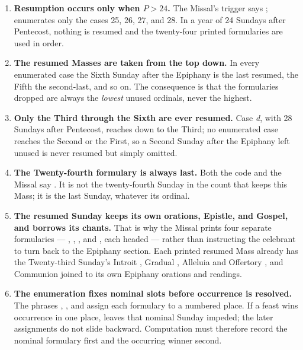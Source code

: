 \begin{enumerate}[leftmargin=1.6em, itemsep=0.35em]
\item \textbf{Resumption occurs only when $P > 24$.} The Missal's trigger says ;  enumerates only the cases 25, 26, 27, and 28. In a year of 24 Sundays after
Pentecost, nothing is resumed and the twenty-four printed formularies are used in order.
\item \textbf{The resumed Masses are taken from the top down.} In every enumerated case the
Sixth Sunday after the Epiphany is the last resumed, the Fifth the second-last, and so on. The
consequence is that the formularies dropped are always the \emph{lowest} unused ordinals, never
the highest.
\item \textbf{Only the Third through the Sixth are ever resumed.} Case \textit{d}, with 28
Sundays after Pentecost, reaches down to the Third; no enumerated case reaches the Second or the
First, so a Second Sunday after the Epiphany left unused is never resumed but simply omitted.
\item \textbf{The Twenty-fourth formulary is always last.} Both the code and the Missal say
. It is not the twenty-fourth Sunday in the count that keeps this Mass; it is the
last Sunday, whatever its ordinal.
\item \textbf{The resumed Sunday keeps its own orations, Epistle, and Gospel, and borrows its
chants.} That is why the Missal prints four separate formularies — ,
, , and , each headed
 — rather than instructing the celebrant to turn back to the Epiphany section.
Each printed resumed Mass already has the Twenty-third Sunday's Introit , Gradual , Alleluia and Offertory
, and Communion  joined to its own Epiphany orations
and readings.
\item \textbf{The enumeration fixes nominal slots before occurrence is resolved.} The phrases
, , and  assign each formulary to a numbered place. If a feast wins occurrence in one
place,  leaves that nominal Sunday impeded; the later assignments do not slide
backward. Computation must therefore record the nominal formulary first and the occurring
winner second.
\end{enumerate}

